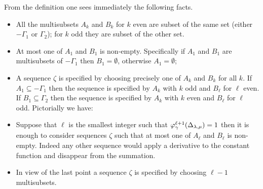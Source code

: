 \documentclass[a4paper]{amsart}
\theoremstyle{definition}
\begin{document}
From the definition one sees immediately the following facts.
\begin{itemize}
  \item
    All the multisubsets $A_k$ and $B_k$ for $k$ even are subset of the same set (either $-\Gamma_1$ or $\Gamma_2$); for $k$ odd they are subset of the other set.

  \item
    At most one of $A_1$ and $B_1$ is non-empty. 
    Specifically if $A_1$ and $B_1$ are multisubsets of $-\Gamma_1$ then $B_1 = \emptyset$, otherwise $A_1 = \emptyset$;

  \item
    A sequence $\zeta$ is specified by choosing precisely one of $A_k$ and $B_k$ for all $k$.
    If $A_1\subseteq -\Gamma_1$ then the sequence is specified by $A_k$ with $k$ odd and $B_\ell$ for $\ell$ even.
    If $B_1\subseteq \Gamma_2$ then the sequence is specified by $A_k$ with $k$ even and $B_\ell$ for $\ell$ odd.
    Pictorially we have:
    \begin{center}
    \end{center}

  \item
    Suppose that $\ell$ is the smallest integer such that $\varphi_\gamma^{\ell+1}(\minor[\lambda][\mu])=1$ then it is enough to consider sequences $\zeta$ such that at most one of $A_\ell$ and $B_\ell$ is non-empty.
    Indeed any other sequence would apply a derivative to the constant function and disappear from the summation.

  \item
    In view of the last point a sequence $\zeta$ is specified by choosing $\ell-1$ multisubsets.
\end{itemize}
\end{document}
